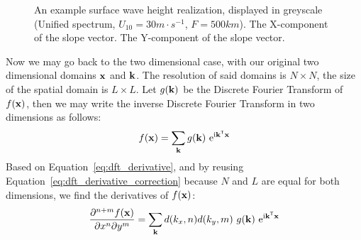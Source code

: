 \begin{figure}
{ }
 \hfill
\caption{ An example
surface wave height realization, displayed in greyscale (Unified spectrum, 
$U_{10}=30m\cdot s^{-1}$, $F=500km$).  The 
X-component of the slope vector. The 
Y-component of the slope vector.
}
\label{fig:derivatives}
\end{figure}
%
Now we may go back to the two dimensional case, with our original two dimensional
domains $\mathbf{x}$ and $\mathbf{k}$. The resolution of said domains is $N \times N$,
the size of the spatial domain is $L \times L$. Let $g(\mathbf{k})$ be the Discrete
Fourier Transform of $f(\mathbf{x})$, then we may write the inverse Discrete Fourier
Transform in two dimensions as follows:
\begin{equation}
 f(\mathbf{x}) = \sum_{\mathbf{k}}g(\mathbf{k})~\mathrm{e}^{\mathrm{i}\mathbf{k}^{\mathsf{T}}\mathbf{x}}
\end{equation}
Based on Equation~\ref{eq:dft_derivative}, and by reusing Equation~\ref{eq:dft_derivative_correction}
because $N$ and $L$ are equal for both dimensions, we find the derivatives of $f(\mathbf{x})$:
\begin{equation}
\label{eq:dft_derivates_2d}
 \dmd{f(\mvec{x})}{n+m}{x}{n}{y}{m} = \sum_{\mvec{k}}d(k_{x}, n)d(k_{y}, m)~g(\mvec{k})~\mathrm{e}^{\mathrm{i}\transpose{\mvec{k}}\mvec{x}}
\end{equation}
